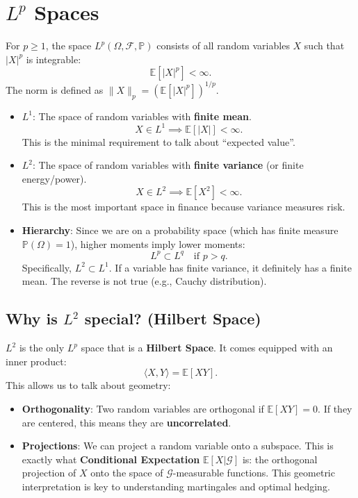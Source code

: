 \section{\texorpdfstring{$L^p$}{Lp} Spaces}

\begin{definition}[$L^p$ Spaces]
For $p \geq 1$, the space $L^p(\Omega, \mathcal{F}, \mathbb{P})$ consists of all random variables $X$ such that $|X|^p$ is integrable:
\[
\mathbb{E}[|X|^p] < \infty.
\]
The norm is defined as $\|X\|_p = (\mathbb{E}[|X|^p])^{1/p}$.
\end{definition}

\begin{itemize}
    \item \textbf{$L^1$}: The space of random variables with \textbf{finite mean}.
    \[
    X \in L^1 \implies \mathbb{E}[|X|] < \infty.
    \]
    This is the minimal requirement to talk about ``expected value''.
    
    \item \textbf{$L^2$}: The space of random variables with \textbf{finite variance} (or finite energy/power).
    \[
    X \in L^2 \implies \mathbb{E}[X^2] < \infty.
    \]
    This is the most important space in finance because variance measures risk.
    \item \textbf{Hierarchy}: Since we are on a probability space (which has finite measure $\mathbb{P}(\Omega)=1$), higher moments imply lower moments:
    \[
    L^p \subset L^q \quad \text{if } p > q.
    \]
    Specifically, $L^2 \subset L^1$. If a variable has finite variance, it definitely has a finite mean. The reverse is not true (e.g., Cauchy distribution).
\end{itemize}

\subsection{Why is \texorpdfstring{$L^2$}{L2} special? (Hilbert Space)}
$L^2$ is the only $L^p$ space that is a \textbf{Hilbert Space}. It comes equipped with an inner product:
\[
\langle X, Y \rangle = \mathbb{E}[XY].
\]
This allows us to talk about geometry:
\begin{itemize}
    \item \textbf{Orthogonality}: Two random variables are orthogonal if $\mathbb{E}[XY] = 0$. If they are centered, this means they are \textbf{uncorrelated}.

    \item \textbf{Projections}: We can project a random variable onto a subspace. This is exactly what \textbf{Conditional Expectation} $\mathbb{E}[X|\mathcal{G}]$ is: the orthogonal projection of $X$ onto the space of $\mathcal{G}$-measurable functions. This geometric interpretation is key to understanding martingales and optimal hedging.
\end{itemize}

